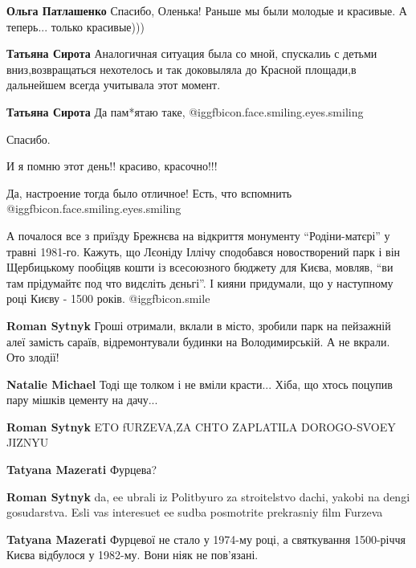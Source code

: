 \begin{itemize}
\begin{itemize}
\textbf{Ольга Патлашенко} Спасибо, Оленька!
Раньше мы были молодые и красивые. А теперь... только красивые)))

\textbf{Татьяна Сирота} Аналогичная ситуация была со мной, спускалиь с детьми вниз,возвращаться нехотелось и так доковыляла до Красной площади,в дальнейшем всегда учитывала этот момент.

\textbf{Татьяна Сирота} Да пам*ятаю таке, @igg{fbicon.face.smiling.eyes.smiling} 
\end{itemize} %

Спасибо.

И я помню этот день!! красиво, красочно!!!

Да, настроение тогда было отличное!
Есть, что вспомнить  @igg{fbicon.face.smiling.eyes.smiling} 


А почалося все з приїзду Брежнєва на відкриття монументу \enquote{Родіни-матєрі} у
травні 1981-го. Кажуть, що Лєоніду Іллічу сподобався новостворений парк і він
Щербицькому пообіцяв кошти із всесоюзного бюджету для Києва, мовляв, \enquote{ви там
прідумайтє под что видєліть дєньгі}. І кияни придумали, що у наступному році
Києву - 1500 років.  @igg{fbicon.smile} 

\begin{itemize} %
\textbf{Roman Sytnyk} Гроші отримали, вклали в місто, зробили парк на пейзажній алеї замість сараїв, відремонтували будинки на Володимирській. А не вкрали. Ото злодії!

\begin{itemize} %
\textbf{Natalie Michael} Тоді ще толком і не вміли красти... Хіба, що хтось поцупив пару мішків цементу на дачу...

\textbf{Roman Sytnyk} ETO fURZEVA,ZA CHTO ZAPLATILA DOROGO-SVOEY JIZNYU

\textbf{Tatyana Mazerati} Фурцева?

\textbf{Roman Sytnyk} da, ee ubrali iz Politbyuro za stroitelstvo dachi, yakobi
na dengi gosudarstva. Esli vas interesuet ee sudba posmotrite prekrasniy film
Furzeva

\textbf{Tatyana Mazerati} Фурцевої не стало у 1974-му році, а святкування 1500-річчя Києва відбулося у 1982-му. Вони ніяк не пов'язані.
\end{itemize} %


\end{itemize}
\end{itemize}
